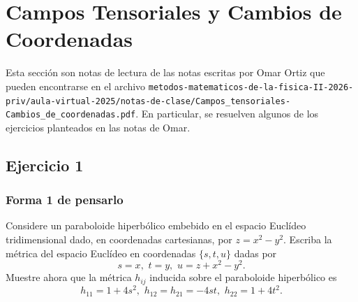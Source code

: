 \documentclass[aps,prl,twocolumn,groupedaddress]{revtex4-2}
\begin{document}
\section{Campos Tensoriales y Cambios de Coordenadas}

Esta secci\'on son notas de lectura de las notas escritas por Omar Ortiz que pueden encontrarse en el archivo \verb+metodos-matematicos-de-la-fisica-II-2026-priv/aula-virtual-2025/notas-de-clase/Campos_tensoriales-Cambios_de_coordenadas.pdf+.
En particular, se resuelven algunos de los ejercicios planteados en las notas de Omar.

\subsection{Ejercicio 1}


\subsubsection{Forma 1 de pensarlo}

Considere un paraboloide hiperb\'olico embebido en el espacio Eucl\'ideo tridimensional dado, en coordenadas cartesianas, por $z=x^2-y^2$.
Escriba la m\'etrica del espacio Eucl\'ideo en coordenadas $\{s,t,u\}$ dadas por 
$$
s=x,\,\, t=y,\,\, u=z+x^2-y^2.
$$
Muestre ahora que la m\'etrica $h_{ij}$ inducida sobre el paraboloide hiperb\'olico es
$$
h_{11}=1+4s^2,\,\,
h_{12}=h_{21} = -4st,\,\,
h_{22}=1+4t^2.
$$
\end{document}
